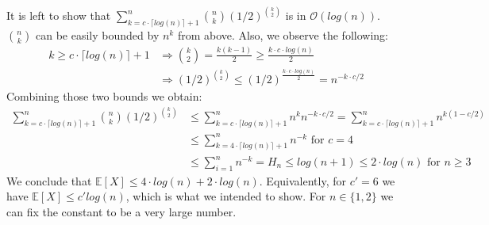 \documentclass[a4paper,german]{article}
\newcommand{\E}{\mathbb{E}}
\begin{document}
It is left to show that \( \sum_{k=c \cdot \lceil log(n) \rceil + 1}^n {n \choose k} (1/2)^{k \choose 2}  \) is in \(\mathcal{O}(log(n))\). \( {n \choose k} \) can be easily bounded by \(n^k\) from above. Also, we observe the following:
\begin{align*}
k \geq c \cdot \lceil log(n) \rceil + 1 &\Rightarrow {k \choose 2} = \frac{k(k-1)}{2} \geq \frac{k\cdot c \cdot log(n)}{2} \\
& \Rightarrow (1/2)^{k \choose 2} \leq (1/2) ^ \frac{k\cdot c \cdot log(n)}{2} = n ^ {-{k \cdot c /2}}
\end{align*}
Combining those two bounds we obtain:
\begin{align*}
\sum_{k=c \cdot \lceil log(n) \rceil + 1}^n {n \choose k} (1/2)^{k \choose 2} &\leq \sum_{k=c \cdot \lceil log(n) \rceil + 1}^n n^k n ^ {-{k \cdot c /2}} = \sum_{k=c \cdot \lceil log(n) \rceil + 1}^n  n^{k(1 - c/2)} \\
&\leq \sum_{k=4 \cdot \lceil log(n) \rceil + 1}^n n ^ {-k} \text{ for } c = 4\\\
&\leq \sum_{i=1}^n n^{-k} = H_n \leq log(n + 1) \leq 2 \cdot log(n) \text{ for } n \geq 3
\end{align*}
We conclude that \(\E[X] \leq  4 \cdot log(n) + 2 \cdot log(n)\). Equivalently, for \(c' = 6\) we have \(\E[X] \leq c' log(n)\), which is what we intended to show. For \(n \in \{1,2\} \) we can fix the constant to be a very large number. 
\end{document}

